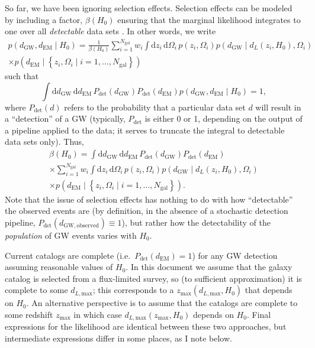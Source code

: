 \documentclass[modern]{article}
\newcommand{\dd}{\mathrm{d}}
\newcommand{\dEM}{d_{\mathrm{EM}}}
\newcommand{\dGW}{d_{\mathrm{GW}}}
\newcommand{\Ngal}{N_{\mathrm{gal}}}
\newcommand{\Pdet}{P_{\mathrm{det}}}
\begin{document}
So far, we have been ignoring selection effects.  Selection effects can be
modeled by including a factor, $\beta\left( H_0 \right)$ ensuring that the
marginal likelihood integrates to one over all \emph{detectable} data sets
\cite{Mandel2018}.  In other words, we write
%
\begin{multline}
    p\left( \dGW, \dEM \mid H_0 \right) = \frac{1}{\beta\left( H_0 \right)} \sum_{i=1}^{\Ngal} w_i \int \dd z_i \, \dd \Omega_i \, p\left( z_i, \Omega_i \right) p\left( \dGW \mid d_L\left( z_i, H_0 \right), \Omega_i \right) \\ \times p\left( \dEM \mid \left\{ z_i, \Omega_i \mid i = 1, \ldots, \Ngal \right\} \right)
\end{multline}
%
such that
\begin{equation}
    \int \dd \dGW \, \dd \dEM \, \Pdet\left( \dGW \right) \Pdet\left( \dEM \right) p\left( \dGW, \dEM \mid H_0 \right) = 1,
\end{equation}
%
where $\Pdet\left(d\right)$ refers to the probability that a particular data set
$d$ will result in a ``detection'' of a \ac{GW} (typically, $\Pdet$ is either 0
or 1, depending on the output of a pipeline applied to the data; it serves to
truncate the integral to detectable data sets only).  Thus,
%
\begin{multline}
    \label{eq:beta-H0-full-def}
    \beta\left( H_0 \right) =  \int \dd \dGW \, \dd \dEM \, \Pdet\left( \dGW \right) \Pdet\left( \dEM \right) \\ \times \sum_{i=1}^{\Ngal} w_i \int \dd z_i \, \dd \Omega_i \, p\left( z_i, \Omega_i \right) p\left( \dGW \mid d_L\left( z_i, H_0 \right), \Omega_i \right) \\ \times p\left( \dEM \mid \left\{ z_i, \Omega_i \mid i = 1, \ldots, \Ngal \right\} \right).
\end{multline}
%
Note that the issue of selection effects has nothing to do with how
``detectable'' the observed events are (by definition, in the absence of a
stochastic detection pipeline, $\Pdet\left( d_{\mathrm{GW},\mathrm{observed}}
\right) \equiv 1$), but rather how the detectability of the \emph{population} of
\ac{GW} events varies with $H_0$.

Current catalogs are complete (i.e.\ $\Pdet\left( \dEM \right) = 1$) for any
\ac{GW} detection assuming reasonable values of $H_0$.  In this document we
assume that the galaxy catalog is selected from a flux-limited survey, so (to
sufficient approximation) it is complete to some $d_{L, \mathrm{max}}$; this
corresponds to a $z_{\mathrm{max}}\left( d_{L,\mathrm{max}}, H_0 \right)$ that
depends on $H_0$.  An alternative perspective is to assume that the catalogs are
complete to some redshift $z_\mathrm{max}$ in which case
$d_{L,\mathrm{max}}\left( z_\mathrm{max}, H_0 \right)$ depends on $H_0$.  Final
expressions for the likelihood are identical between these two approaches, but
intermediate expressions differ in some places, as I note below.
\end{document}
